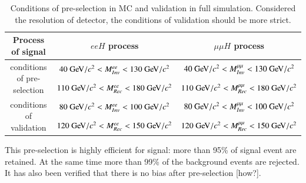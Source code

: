 \documentclass[11pt,a4paper]{cepcnote}
\begin{document}
\begin{table}[H]
\newcommand{\tabincell}[2]{\begin{tabular}{@{}#1@{}}#2\end{tabular}}
 \begin{center}
  \begin{tabular}{|c|c|c|}
  \hline \hline
  Process of signal				&		$eeH$ process						&				$\mu\mu H$ process\\
  \hline
  \multirow{2}{*}{conditions of pre-selection} 	&	$40\gev/c^2 < M_{Inv}^{ee} < 130\gev/c^2$&$40\gev/c^2 < M_{Inv}^{\mu\mu} < 130\gev/c^2$	\\
  											&	$110\gev/c^2 < M_{Rec}^{ee} < 180\gev/c^2$		&$110\gev/c^2 < M_{Rec}^{\mu\mu} < 180\gev/c^2$\\
  \hline
  \multirow{2}{*}{conditions of validation}	&	$80\gev/c^2 < M_{Inv}^{ee} < 100\gev/c^2$&$80\gev/c^2 < M_{Inv}^{\mu\mu} < 100\gev/c^2$	\\
  											&	$120\gev/c^2 < M_{Rec}^{ee} < 150\gev/c^2$		&$120\gev/c^2 < M_{Rec}^{\mu\mu} < 150\gev/c^2$\\
  \hline \hline
  \end{tabular}
  \caption[]{Conditions of pre-selection in MC and validation in full simulation. Considered the resolution of detector, the conditions of 
  validation should be more strict.}
  \label{tab:llhprecut}
 \end{center}
\end{table}
This pre-selection is highly efficient for signal: more than 95\% of signal event are retained. At the same time
more than 99\% of the background events are rejected. It has also been verified that there is no bias after pre-selection {\color{red}[how?]}.
\end{document}
